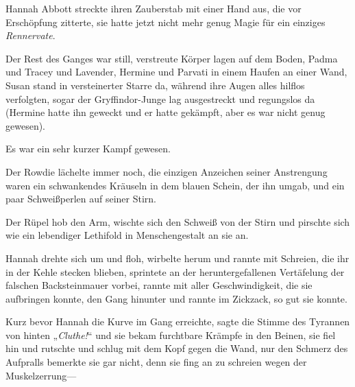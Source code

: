 \later

Hannah Abbott streckte ihren Zauberstab mit einer Hand aus, die vor Erschöpfung zitterte, sie hatte jetzt nicht mehr genug Magie für ein einziges \emph{Rennervate}.

Der Rest des Ganges war still, verstreute Körper lagen auf dem Boden, Padma und Tracey und Lavender, Hermine und Parvati in einem Haufen an einer Wand, Susan stand in versteinerter Starre da, während ihre Augen alles hilflos verfolgten, sogar der Gryffindor-Junge lag ausgestreckt und regungslos da (Hermine hatte ihn geweckt und er hatte gekämpft, aber es war nicht genug gewesen).

Es war ein sehr kurzer Kampf gewesen.

Der Rowdie lächelte immer noch, die einzigen Anzeichen seiner Anstrengung waren ein schwankendes Kräuseln in dem blauen Schein, der ihn umgab, und ein paar Schweißperlen auf seiner Stirn.

Der Rüpel hob den Arm, wischte sich den Schweiß von der Stirn und pirschte sich wie ein lebendiger Lethifold in Menschengestalt an sie an.

Hannah drehte sich um und floh, wirbelte herum und rannte mit Schreien, die ihr in der Kehle stecken blieben, sprintete an der heruntergefallenen Vertäfelung der falschen Backsteinmauer vorbei, rannte mit aller Geschwindigkeit, die sie aufbringen konnte, den Gang hinunter und rannte im Zickzack, so gut sie konnte.

Kurz bevor Hannah die Kurve im Gang erreichte, sagte die Stimme des Tyrannen von hinten „\emph{Cluthe!}“ und sie bekam furchtbare Krämpfe in den Beinen, sie fiel hin und rutschte und schlug mit dem Kopf gegen die Wand, nur den Schmerz des Aufpralls bemerkte sie gar nicht, denn sie fing an zu schreien wegen der Muskelzerrung—


